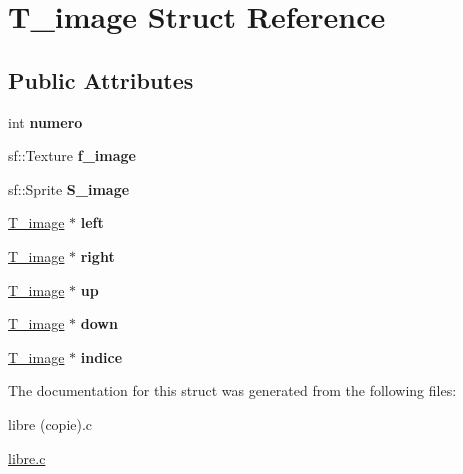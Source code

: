 \hypertarget{structT__image}{\section{T\-\_\-image Struct Reference}
\label{structT__image}
}
\subsection*{Public Attributes}
\begin{DoxyCompactItemize}
\item 
\hypertarget{structT__image_aa6487786d747d7b02b042ee18c5390b6}{int {\bfseries numero}}\label{structT__image_aa6487786d747d7b02b042ee18c5390b6}

\item 
\hypertarget{structT__image_a82b8f0c7d76b399e98922923dc16873a}{sf\-::\-Texture {\bfseries f\-\_\-image}}\label{structT__image_a82b8f0c7d76b399e98922923dc16873a}

\item 
\hypertarget{structT__image_a93c69963735f495875c95ac0d6e2c686}{sf\-::\-Sprite {\bfseries S\-\_\-image}}\label{structT__image_a93c69963735f495875c95ac0d6e2c686}

\item 
\hypertarget{structT__image_a0c125cc798bc8fea764671494265d918}{\hyperlink{structT__image}{T\-\_\-image} $\ast$ {\bfseries left}}\label{structT__image_a0c125cc798bc8fea764671494265d918}

\item 
\hypertarget{structT__image_a9480596b247c38aef612e978a18388ea}{\hyperlink{structT__image}{T\-\_\-image} $\ast$ {\bfseries right}}\label{structT__image_a9480596b247c38aef612e978a18388ea}

\item 
\hypertarget{structT__image_a439e587ddc932f4ded44c48986b7e6e4}{\hyperlink{structT__image}{T\-\_\-image} $\ast$ {\bfseries up}}\label{structT__image_a439e587ddc932f4ded44c48986b7e6e4}

\item 
\hypertarget{structT__image_ad321d3f367d8e179937cb98f7c468dc2}{\hyperlink{structT__image}{T\-\_\-image} $\ast$ {\bfseries down}}\label{structT__image_ad321d3f367d8e179937cb98f7c468dc2}

\item 
\hypertarget{structT__image_af4e0caa787c757489d5f4ea11841b010}{\hyperlink{structT__image}{T\-\_\-image} $\ast$ {\bfseries indice}}\label{structT__image_af4e0caa787c757489d5f4ea11841b010}

\end{DoxyCompactItemize}


The documentation for this struct was generated from the following files\-:\begin{DoxyCompactItemize}
\item 
libre (copie).\-c\item 
\hyperlink{libre_8c}{libre.\-c}\end{DoxyCompactItemize}
